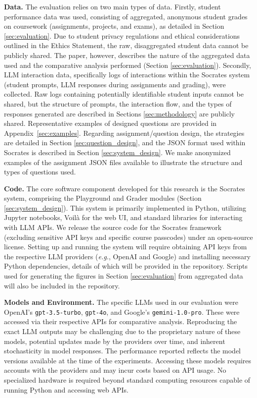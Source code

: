 \documentclass{article} %
\begin{document}
\textbf{Data.}
The evaluation relies on two main types of data. Firstly, {student performance data} was used, consisting of aggregated, anonymous student grades on coursework (assignments, projects, and exams), as detailed in Section \ref{sec:evaluation}. Due to student privacy regulations and ethical considerations outlined in the Ethics Statement, the raw, disaggregated student data cannot be publicly shared. The paper, however, describes the nature of the aggregated data used and the comparative analysis performed (Section \ref{sec:evaluation}). Secondly, {LLM interaction data}, specifically logs of interactions within the \textsf{Socrates} system (student prompts, LLM responses during assignments and grading), were collected. Raw logs containing potentially identifiable student inputs cannot be shared, but the structure of prompts, the interaction flow, and the types of responses generated are described in Sections \ref{sec:methodology} are publicly shared. Representative examples of designed questions are provided in Appendix~\ref{sec:examples}. Regarding {assignment/question design}, the strategies are detailed in Section \ref{sec:question_design}, and the JSON format used within \textsf{Socrates} is described in Section \ref{sec:system_design}. We make anonymized examples of the assignment JSON files available to illustrate the structure and types of questions used.

\textbf{Code.}
The core software component developed for this research is the \textsf{Socrates} system, comprising the Playground and Grader modules (Section \ref{sec:system_design}). This system is primarily implemented in Python, utilizing Jupyter notebooks, Voil\`{a} for the web UI, and standard libraries for interacting with LLM APIs. We release the source code for the \textsf{Socrates} framework (excluding sensitive API keys and specific course passcodes) under an open-source license. Setting up and running the system will require obtaining API keys from the respective LLM providers ({\em e.g.}, OpenAI and Google) and installing necessary Python dependencies, details of which will be provided in the repository. Scripts used for generating the figures in Section \ref{sec:evaluation} from aggregated data will also be included in the repository.

\textbf{Models and Environment.}
The specific LLMs used in our evaluation were OpenAI's \texttt{gpt-3.5-turbo}, \texttt{gpt-4o}, and Google's \texttt{gemini-1.0-pro}. These were accessed via their respective APIs for comparative analysis. Reproducing the exact LLM outputs may be challenging due to the proprietary nature of these models, potential updates made by the providers over time, and inherent stochasticity in model responses. The performance reported reflects the model versions available at the time of the experiments. Accessing these models requires accounts with the providers and may incur costs based on API usage. No specialized hardware is required beyond standard computing resources capable of running Python and accessing web APIs.
\end{document}
